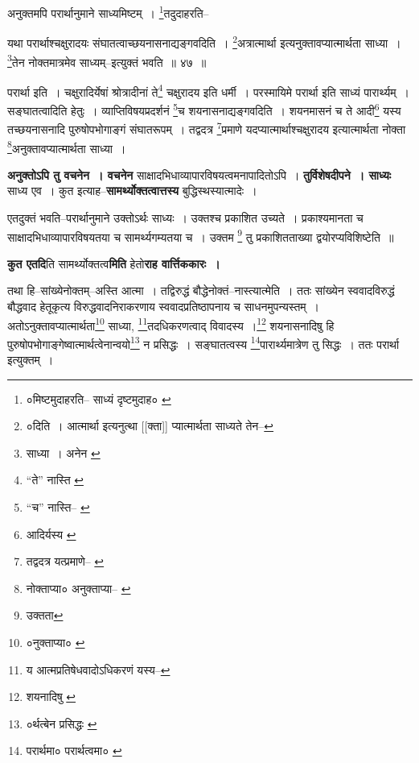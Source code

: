 \documentclass[article,12pt,a4paper]{memoir}
\begin{document}
	  \pstart अनुक्तमपि परार्थानुमाने साध्यमिष्टम् । \footnote{०मिष्टमुदाहरति--\cite{dp-msB} साध्यं दृष्टमुदाह० \cite{dp-msC} \cite{dp-msD}}\-तदुदाहरति--
	\pend
       
	  \bigskip
	  \begingroup
	

	  \pstart यथा परार्थाश्चक्षुरादयः संघातत्वाच्छयनासनाद्यङ्गवदिति । \footnote{०दिति । आत्मार्था इत्यनुत्था [[क्ता]] प्यात्मार्थता साध्यते तेन--\cite{dp-msC}}\-अत्रात्मार्था इत्यनुक्तावप्यात्मार्थता साध्या । \footnote{साध्या । अनेन \cite{dp-msB} \cite{dp-edP} \cite{dp-edH} \cite{dp-edE}}\-तेन नोक्तमात्रमेव साध्यम्--इत्युक्तं भवति ॥ ४७ ॥
	\pend
      
	  \endgroup
	 

	  \pstart परार्था इति । चक्षुरादिर्येषां श्रोत्रादीनां ते\footnote{“ते” नास्ति \cite{dp-msB}} चक्षुरादय इति धर्मी । परस्मायिमे परार्था इति साध्यं पारार्थ्यम् । सङ्घातत्वादिति हेतुः । व्याप्तिविषयप्रदर्शनं \footnote{“च” नास्ति--\cite{dp-msA} \cite{dp-msB} \cite{dp-msD} \cite{dp-edP} \cite{dp-edH} \cite{dp-edE} \cite{dp-edN}}\-च शयनासनाद्यङ्गवदिति । शयनमासनं च ते आदी\footnote{आदिर्यस्य \cite{dp-msD}} यस्य तच्छयनासनादि पुरुषोपभोगाङ्गं संघातरूपम् । तद्वदत्र \footnote{तद्वदत्र यत्प्रमाणे--\cite{dp-msA} \cite{dp-msB} \cite{dp-edP} \cite{dp-edH}}\-प्रमाणे यदप्यात्मार्थाश्चक्षुरादय इत्यात्मार्थता नोक्ता \footnote{नोक्ताप्या० \cite{dp-msB} अनुक्ताप्या--\cite{dp-msA} \cite{dp-msC} \cite{dp-msD} \cite{dp-edP} \cite{dp-edH} \cite{dp-edE} \cite{dp-edN}}\-अनुक्तावप्यात्मार्थता साध्या ।
	\pend
      
	  \endgroup
	

	  \pstart \textbf{अनुक्तोऽपि तु वचनेन । वचनेन} साक्षादभिधाव्यापारविषयत्वमनापादितोऽपि । \textbf{तुर्विशेषदीपने । साध्यः} साध्य एव । कुत इत्याह--\textbf{सामर्थ्योक्तत्वात्तस्य} बुद्धिस्थस्यात्मादेः ।
	\pend
      

	  \pstart एतदुक्तं भवति--परार्थानुमाने उक्तोऽर्थः साध्यः । उक्तश्च प्रकाशित उच्यते । प्रकाश्यमानता च साक्षादभिधाव्यापारविषयतया च सामर्थ्यगम्यतया च । उक्तम \footnote{उक्तता} तु प्रकाशितताख्या द्वयोरप्यविशिष्टेति ॥
	\pend
      

	  \pstart \textbf{कुत एतदि}ति सामर्थ्योक्तत्व\textbf{मिति} हेतो\textbf{राह वार्त्तिककारः ।}
	\pend
	  \bigskip
	  \begingroup
	

	  \pstart तथा हि--सांख्येनोक्तम्--अस्ति आत्मा । तद्विरुद्धं बौद्धेनोक्तं--नास्त्यात्मेति । ततः सांख्येन स्ववादविरुद्धं बौद्धवाद हेतूकृत्य विरुद्धवादनिराकरणाय स्ववादप्रतिष्ठापनाय च साधनमुपन्यस्तम् । अतोऽनुक्तावप्यात्मार्थता\footnote{०नुक्ताप्या० \cite{dp-msA} \cite{dp-msB} \cite{dp-msC} \cite{dp-msD} \cite{dp-edP} \cite{dp-edH} \cite{dp-edE} \cite{dp-edN}} साध्या, \footnote{य आत्मप्रतिषेधवादोऽधिकरणं यस्य--\cite{dp-msD-n}}\-तदधिकरणत्वाद् विवादस्य ।\footnote{शयनादिषु \cite{dp-msA}} शयनासनादिषु हि पुरुषोपभोगाङ्गेष्वात्मार्थत्वेनान्वयो\footnote{०र्थत्बेन प्रसिद्धः \cite{dp-msA}} न प्रसिद्धः । सङ्घातत्वस्य \footnote{परार्थमा० \cite{dp-msA} \cite{dp-msB} \cite{dp-edP} \cite{dp-edH} परार्थत्वमा० \cite{dp-edN}}\-पारार्थ्यमात्रेण तु सिद्धः । ततः परार्था इत्युक्तम् ।
	\pend
       
\end{document}
